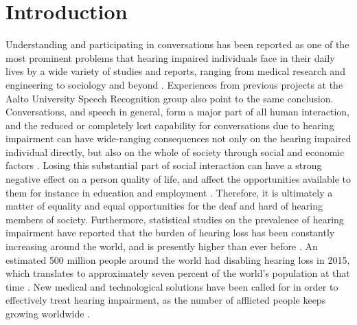 \documentclass[english, 12pt, a4paper, pdftex, elec, utf8]{aaltothesis}
\begin{document}

\cleardoublepage
\storeinipagenumber
{}
\setcounter{page}{1}

\section{Introduction}

Understanding and participating in conversations has been reported as one of the most prominent problems that hearing impaired individuals face in their daily lives by a wide variety of studies and reports, ranging from medical research and engineering to sociology and beyond \cite{moore2007cochlear, peterson2010cochlear, wilson2017global, ohlenforst2017effects, stacey2006hearing, healy2016difficulty, hietala2008huonokuuloinen, koskela2013kuulokojeen, lavikainen2014, blomberg2012sisakorvaistutetta, haatainen2013viestintahaasteet}. Experiences from previous projects at the Aalto University Speech Recognition group also point to the same conclusion. Conversations, and speech in general, form a major part of all human interaction, and the reduced or completely lost capability for conversations due to hearing impairment can have wide-ranging consequences not only on the hearing impaired individual directly, but also on the whole of society through social and economic factors \cite{stacey2006hearing, koskela2013kuulokojeen}. Losing this substantial part of social interaction can have a strong negative effect on a person quality of life, and affect the opportunities available to them for instance in education and employment \cite{hietala2008huonokuuloinen, lavikainen2014}. Therefore, it is ultimately a matter of equality and equal opportunities for the deaf and hard of hearing members of society. Furthermore, statistical studies on the prevalence of hearing impairment have reported that the burden of hearing loss has been constantly increasing around the world, and is presently higher than ever before \cite{wilson2017global, mathers2000global}. An estimated 500 million people around the world had disabling hearing loss in 2015, which translates to approximately seven percent of the world’s population at that time \cite{wilson2017global}. New medical and technological solutions have been called for in order to effectively treat hearing impairment, as the number of afflicted people keeps growing worldwide \cite{wilson2017global}. \\\\
\end{document}
